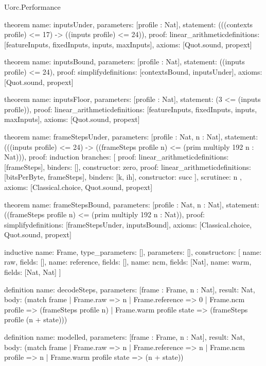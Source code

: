 \begin{lexlean}{Uorc.Performance}
\begin{semanticmodule}
theorem{
  name: inputsUnder,
  parameters: [profile : Nat],
  statement: (((contexts profile) <= 17) -> ((inputs profile) <= 24)),
  proof: linear_arithmetic{definitions: [featureInputs, fixedInputs, inputs, maxInputs]},
  axioms: [Quot.sound, propext]
}

theorem{
  name: inputsBound,
  parameters: [profile : Nat],
  statement: ((inputs profile) <= 24),
  proof: simplify{definitions: [contextsBound, inputsUnder]},
  axioms: [Quot.sound, propext]
}

theorem{
  name: inputsFloor,
  parameters: [profile : Nat],
  statement: (3 <= (inputs profile)),
  proof: linear_arithmetic{definitions: [featureInputs, fixedInputs, inputs, maxInputs]},
  axioms: [Quot.sound, propext]
}

theorem{
  name: frameStepsUnder,
  parameters: [profile : Nat, n : Nat],
  statement: (((inputs profile) <= 24) -> ((frameSteps profile n) <= (prim multiply 192 n : Nat))),
  proof: induction{
    branches: [
      {proof: linear_arithmetic{definitions: [frameSteps]}, binders: [], constructor: zero},
      {
        proof: linear_arithmetic{definitions: [bitsPerByte, frameSteps]},
        binders: [k, ih],
        constructor: succ
      }
    ],
    scrutinee: n
  },
  axioms: [Classical.choice, Quot.sound, propext]
}

theorem{
  name: frameStepsBound,
  parameters: [profile : Nat, n : Nat],
  statement: ((frameSteps profile n) <= (prim multiply 192 n : Nat)),
  proof: simplify{definitions: [frameStepsUnder, inputsBound]},
  axioms: [Classical.choice, Quot.sound, propext]
}

inductive{
  name: Frame,
  type_parameters: [],
  parameters: [],
  constructors: [
    {name: raw, fields: []},
    {name: reference, fields: []},
    {name: ncm, fields: [Nat]},
    {name: warm, fields: [Nat, Nat]}
  ]
}

definition{
  name: decodeSteps,
  parameters: [frame : Frame, n : Nat],
  result: Nat,
  body: (match frame
    | Frame.raw => n
    | Frame.reference => 0
    | Frame.ncm profile => (frameSteps profile n)
    | Frame.warm profile state => (frameSteps profile (n + state)))
}

definition{
  name: modelled,
  parameters: [frame : Frame, n : Nat],
  result: Nat,
  body: (match frame
    | Frame.raw => n
    | Frame.reference => n
    | Frame.ncm profile => n
    | Frame.warm profile state => (n + state))
}


\end{semanticmodule}
\end{lexlean}
